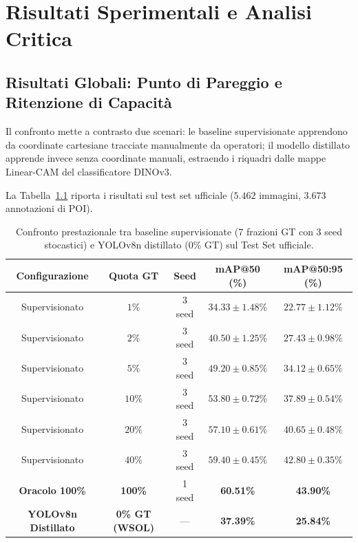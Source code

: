 \chapter{Risultati Sperimentali e Analisi Critica}
\label{chap:risultati}

\section{Risultati Globali: Punto di Pareggio e Ritenzione di Capacità}
\label{sec:ris_globali}
Il confronto mette a contrasto due scenari: le baseline supervisionate apprendono da coordinate cartesiane tracciate manualmente da operatori; il modello distillato apprende invece senza coordinate manuali, estraendo i riquadri dalle mappe Linear-CAM del classificatore DINOv3.

La Tabella~\ref{tab:risultati_sample_efficiency} riporta i risultati sul test set ufficiale ($5.462$ immagini, $3.673$ annotazioni di POI).

\begin{table}[htbp]
\centering
\footnotesize
\setlength{\tabcolsep}{4pt}
\begin{tabular*}{\textwidth}{@{\extracolsep{\fill}}ccccc}
\toprule
\textbf{Configurazione} & \textbf{Quota GT} & \textbf{Seed} & \textbf{mAP@50 (\%)} & \textbf{mAP@50:95 (\%)} \\
\midrule
Supervisionato & $1\%$ & 3 seed & $34.33 \pm 1.48\%$ & $22.77 \pm 1.12\%$ \\
Supervisionato & $2\%$ & 3 seed & $40.50 \pm 1.25\%$ & $27.43 \pm 0.98\%$ \\
Supervisionato & $5\%$ & 3 seed & $49.20 \pm 0.85\%$ & $34.12 \pm 0.65\%$ \\
Supervisionato & $10\%$ & 3 seed & $53.80 \pm 0.72\%$ & $37.89 \pm 0.54\%$ \\
Supervisionato & $20\%$ & 3 seed & $57.10 \pm 0.61\%$ & $40.65 \pm 0.48\%$ \\
Supervisionato & $40\%$ & 3 seed & $59.40 \pm 0.45\%$ & $42.80 \pm 0.35\%$ \\
\textbf{Oracolo 100\%} & \textbf{100\%} & 1 seed & \textbf{60.51\%} & \textbf{43.90\%} \\
\midrule
\textbf{YOLOv8n Distillato} & \textbf{0\% GT (WSOL)} & — & \textbf{37.39\%} & \textbf{25.84\%} \\
\bottomrule
\end{tabular*}
\caption{Confronto prestazionale tra baseline supervisionate (7 frazioni GT con 3 seed stocastici) e YOLOv8n distillato (0\% GT) sul Test Set ufficiale.}
\label{tab:risultati_sample_efficiency}
\end{table}

